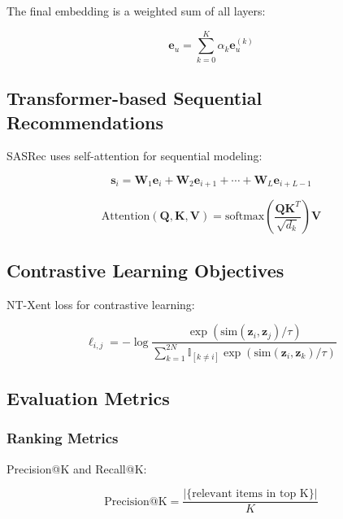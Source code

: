 The final embedding is a weighted sum of all layers:

\begin{equation}
\mathbf{e}_u = \sum_{k=0}^K \alpha_k \mathbf{e}_u^{(k)}
\end{equation}

\subsection{Transformer-based Sequential Recommendations}

SASRec uses self-attention for sequential modeling:

\begin{equation}
\mathbf{s}_i = \mathbf{W}_1 \mathbf{e}_i + \mathbf{W}_2 \mathbf{e}_{i+1} + \cdots + \mathbf{W}_L \mathbf{e}_{i+L-1}
\end{equation}

\begin{equation}
\text{Attention}(\mathbf{Q}, \mathbf{K}, \mathbf{V}) = \mathrm{softmax}\left(\frac{\mathbf{Q}\mathbf{K}^T}{\sqrt{d_k}}\right) \mathbf{V}
\end{equation}

\subsection{Contrastive Learning Objectives}

NT-Xent loss for contrastive learning:

\begin{equation}
\ell_{i,j} = -\log \frac{\exp(\text{sim}(\mathbf{z}_i, \mathbf{z}_j)/\tau)}{\sum_{k=1}^{2N} \mathbb{I}_{[k \neq i]} \exp(\text{sim}(\mathbf{z}_i, \mathbf{z}_k)/\tau)}
\end{equation}

\subsection{Evaluation Metrics}

\subsubsection{Ranking Metrics}

Precision@K and Recall@K:

\begin{equation}
\text{Precision@K} = \frac{|\{ \text{relevant items in top K} \}|}{K}
\end{equation}

